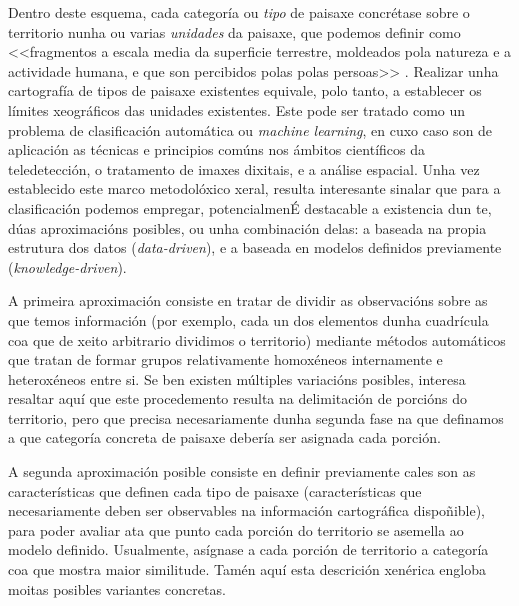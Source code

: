 \documentclass[11pt,a4paper]{article}
\begin{document}
Dentro deste esquema, cada categoría ou \emph{tipo} de paisaxe concrétase sobre o territorio nunha ou varias \emph{unidades} da paisaxe, que podemos definir como <<fragmentos a escala media da superficie terrestre, moldeados pola natureza e a actividade humana, e que son percibidos polas polas persoas>> \citep{Kienast2015136}. Realizar unha cartografía de tipos de paisaxe existentes equivale, polo tanto, a establecer os límites xeográficos das unidades existentes. Este pode ser tratado como un problema de clasificación automática ou \emph{machine learning}, en cuxo caso son de aplicación as técnicas e principios comúns nos ámbitos científicos da teledetección, o tratamento de imaxes dixitais, e a análise espacial. Unha vez establecido este marco metodolóxico xeral, resulta interesante sinalar que para a clasificación podemos empregar, potencialmenÉ destacable a existencia dun te, dúas aproximacións posibles, ou unha combinación delas: a baseada na propia estrutura dos datos (\emph{data-driven}), e a baseada en modelos definidos previamente (\emph{knowledge-driven}).

A primeira aproximación consiste en tratar de dividir as observacións sobre as que temos información (por exemplo, cada un dos elementos dunha cuadrícula coa que de xeito arbitrario dividimos o territorio) mediante métodos automáticos que tratan de formar grupos relativamente homoxéneos internamente e heteroxéneos entre si. Se ben existen múltiples variacións posibles, interesa resaltar aquí que este procedemento resulta na delimitación de porcións do territorio, pero que precisa necesariamente dunha segunda fase na que definamos a que categoría concreta de paisaxe debería ser asignada cada porción. 

A segunda aproximación posible consiste en definir previamente cales son as características que definen cada tipo de paisaxe (características que necesariamente deben ser observables na información cartográfica dispoñible), para poder avaliar ata que punto cada porción do territorio se asemella ao modelo definido. Usualmente, asígnase a cada porción de territorio a categoría coa que mostra maior similitude. Tamén aquí esta descrición xenérica engloba moitas posibles variantes concretas.
\end{document}
